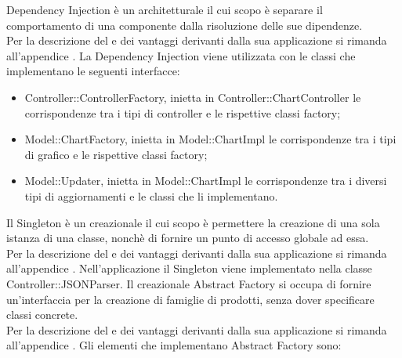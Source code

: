             Dependency Injection è un  architetturale il cui scopo è separare il comportamento di una componente dalla risoluzione delle sue dipendenze.\\
            Per la descrizione del  e dei vantaggi derivanti dalla sua applicazione si rimanda all'appendice .
                La Dependency Injection viene utilizzata con le classi che implementano le seguenti interfacce:
                \begin{itemize}
                    \item Controller::ControllerFactory, inietta in Controller::ChartController le corrispondenze tra i tipi di controller e le rispettive classi factory;
                    \item Model::ChartFactory, inietta in Model::ChartImpl le  corrispondenze tra i tipi di grafico e le rispettive classi factory;
                    \item Model::Updater, inietta in Model::ChartImpl le corrispondenze tra i diversi tipi di aggiornamenti e le classi che li implementano.
                \end{itemize}
            Il Singleton è un  creazionale il cui scopo è permettere la creazione di una sola istanza di una classe, nonchè di fornire un punto di accesso globale ad essa.\\
            Per la descrizione del  e dei vantaggi derivanti dalla sua applicazione si rimanda all'appendice .
                Nell'applicazione  il Singleton viene implementato nella classe Controller::JSONParser.
            Il  creazionale Abstract Factory si occupa di fornire un'interfaccia per la creazione di famiglie di prodotti, senza dover specificare classi concrete. \\
            Per la descrizione del  e dei vantaggi derivanti dalla sua applicazione si rimanda all'appendice .
                Gli elementi che implementano Abstract Factory sono:
